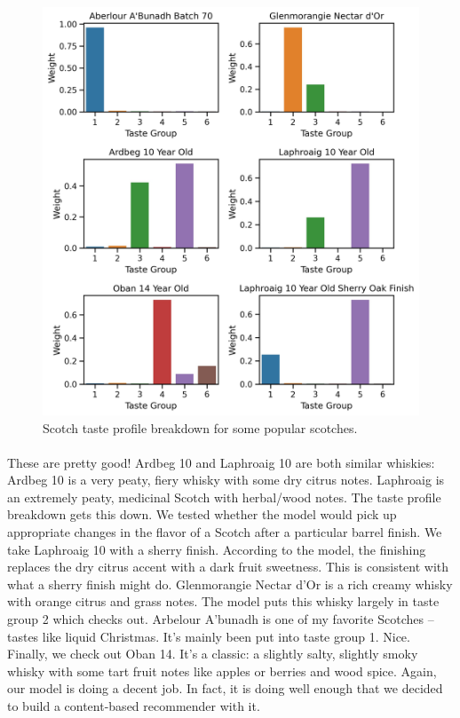 \documentclass{article}
\begin{document}
		 	 \begin{figure}[H]
	\begin{center}
		\includegraphics[totalheight=9cm]{../images/Modeling/scotch_topic_breakdown}
	\end{center}
	\caption{Scotch taste profile breakdown for some popular scotches.}
\end{figure}
\paragraph{} These are pretty good! Ardbeg 10 and Laphroaig 10 are both similar whiskies: Ardbeg 10 is a very peaty, fiery whisky with some dry citrus notes. Laphroaig is an extremely peaty, medicinal Scotch with herbal/wood notes. The taste profile breakdown gets this down. We tested whether the model would pick up appropriate changes in the flavor of a Scotch after a particular barrel finish. We take Laphroaig 10 with a sherry finish. According to the model, the finishing replaces the dry citrus accent with a dark fruit sweetness. This is consistent with what a sherry finish might do. Glenmorangie Nectar d'Or is a rich creamy whisky with orange citrus and grass notes. The model puts this whisky largely in taste group 2 which checks out. Arbelour A'bunadh is one of my favorite Scotches -- tastes like liquid Christmas. It's mainly been put into taste group 1. Nice. Finally, we check out Oban 14. It's a classic: a slightly salty, slightly smoky whisky with some tart fruit notes like apples or berries and wood spice. Again, our model is doing a decent job. In fact, it is doing well enough that we decided to build a content-based recommender with it.
\end{document}

